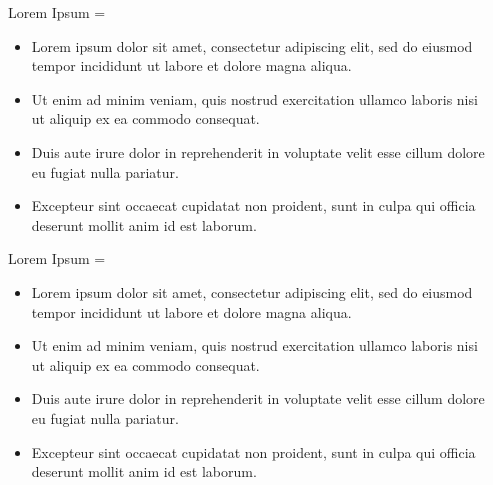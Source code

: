 \documentclass[final,hyperref={pdfpagelabels=false}]{beamer}
\newcommand{\correctitemizeindent}{\setlength{\leftmargini}{2.5em}}
\newlength{\columnheight}
\begin{document}
\begin{frame}
\begin{columns}[T]
\begin{column}{.32\textwidth}
\begin{minipage}[t]{.95\textwidth}
{		\begin{centreColumnBlock}{Lorem Ipsum}
			\rightskip=\leftskip
			{\correctitemizeindent
			\begin{itemize}
				\item Lorem ipsum dolor sit amet, consectetur adipiscing elit, sed do eiusmod tempor incididunt ut labore et dolore magna aliqua.
				\item Ut enim ad minim veniam, quis nostrud exercitation ullamco laboris nisi ut aliquip ex ea commodo consequat.
				\item Duis aute irure dolor in reprehenderit in voluptate velit esse cillum dolore eu fugiat nulla pariatur.
				\item Excepteur sint occaecat cupidatat non proident, sunt in culpa qui officia deserunt mollit anim id est laborum.
			\end{itemize}
			}
		\end{centreColumnBlock}

		\vfill

				
		\begin{centreColumnBlock}{Lorem Ipsum}
			\rightskip=\leftskip
			{\correctitemizeindent
			\begin{itemize}
				\item Lorem ipsum dolor sit amet, consectetur adipiscing elit, sed do eiusmod tempor incididunt ut labore et dolore magna aliqua.
				\item Ut enim ad minim veniam, quis nostrud exercitation ullamco laboris nisi ut aliquip ex ea commodo consequat.
				\item Duis aute irure dolor in reprehenderit in voluptate velit esse cillum dolore eu fugiat nulla pariatur.
				\item Excepteur sint occaecat cupidatat non proident, sunt in culpa qui officia deserunt mollit anim id est laborum.
			\end{itemize}
			}
		\end{centreColumnBlock}
		}
		\end{minipage}
	\end{column}

 	\begin{column}{.32\textwidth}
		\begin{minipage}[t]{.95\textwidth}
		\parbox[t][\columnheight]{\textwidth}{	  
			
}
\end{minipage}
\end{column}
\end{columns}
\end{frame}
\end{document}
